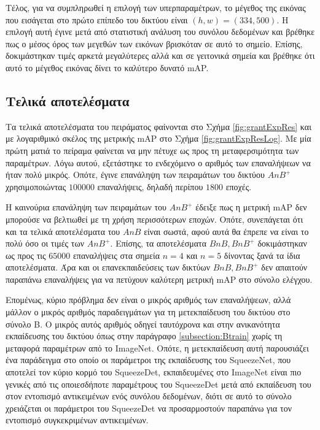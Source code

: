 Τέλος, για να συμπληρωθεί η επιλογή των υπερπαραμέτρων, το μέγεθος της εικόνας που εισάγεται στο πρώτο επίπεδο του δικτύου είναι $(h,w) = (334, 500)$. Η επιλογή αυτή έγινε μετά από στατιστική ανάλυση του συνόλου δεδομένων και βρέθηκε πως ο μέσος όρος των μεγεθών των εικόνων βρισκόταν σε αυτό το σημείο. Επίσης, δοκιμάστηκαν τιμές αρκετά μεγαλύτερες αλλά και σε γειτονικά σημεία και βρέθηκε ότι αυτό το μέγεθος εικόνας δίνει το καλύτερο δυνατό mAP.

\subsection{Τελικά αποτελέσματα}
\label{section:grantExpRes}
Τα τελικά αποτελέσματα του πειράματος φαίνονται στο Σχήμα \ref{fig:grantExpRes} και με λογαριθμικό σκέλος της μετρικής mAP στο Σχήμα \ref{fig:grantExpResLog}. Με μία πρώτη ματιά το πείραμα φαίνεται να μην πέτυχε ως προς τη μεταφερσιμότητα των παραμέτρων. Λόγω αυτού, εξετάστηκε το ενδεχόμενο ο αριθμός των επαναλήψεων να ήταν πολύ μικρός. Οπότε, έγινε επανάληψη των πειραμάτων του δικτύου $AnB^+$ χρησιμοποιώντας $100000$ επαναλήψεις, δηλαδή περίπου $1800$ εποχές.

Η καινούρια επανάληψη των πειραμάτων του $AnB^+$ έδειξε πως η μετρική mAP δεν μπορούσε να βελτιωθεί με τη χρήση περισσότερων εποχών. Οπότε, συνεπάγεται ότι και τα τελικά αποτελέσματα του $AnB$ είναι σωστά, αφού αυτά θα έπρεπε να είναι το πολύ όσο οι τιμές των $AnB^+$. Επίσης, τα αποτελέσματα $BnB, BnB^+$ δοκιμάστηκαν ως προς τις $65000$ επαναλήψεις στα σημεία $n=4$ και $n=5$ δίνοντας ξανά τα ίδια αποτελέσματα. Άρα και οι επανεκπαιδεύσεις των δικτύων $BnB, BnB^+$ δεν απαιτούν παραπάνω επαναλήψεις για να πετύχουν καλύτερη μετρική mAP στο σύνολο ελέγχου. 

Επομένως, κύριο πρόβλημα δεν είναι ο μικρός αριθμός των επαναλήψεων, αλλά μάλλον ο μικρός αριθμός παραδειγμάτων για τη μετεκπαίδευση του δικτύου στο σύνολο Β. Ο μικρός αυτός αριθμός οδηγεί ταυτόχρονα και στην ανικανότητα εκπαίδευσης του δικτύου όπως στην παράγραφο \ref{subsection:Btrain} χωρίς τη μεταφορά παραμέτρων από το ImageNet. Οπότε, η μετεκπαίδευση αυτή παρουσιάζει ένα παράδειγμα στο οποίο οι παράμετροι της εκπαίδευσης του SqueezeNet, που αποτελεί τον κύριο κορμό του SqueezeDet, εκπαιδευμένες στο ImageNet είναι πιο γενικές από τις οποιεσδήποτε παραμέτρους του SqueezeDet μετά από εκπαίδευση του στον εντοπισμό αντικειμένων ενός συνόλου δεδομένων, διότι σε αυτό το σύνολο χρειάζεται οι παράμετροι του SqueezeDet να προσαρμοστούν παραπάνω για τον εντοπισμό συγκεκριμένων αντικειμένων.

